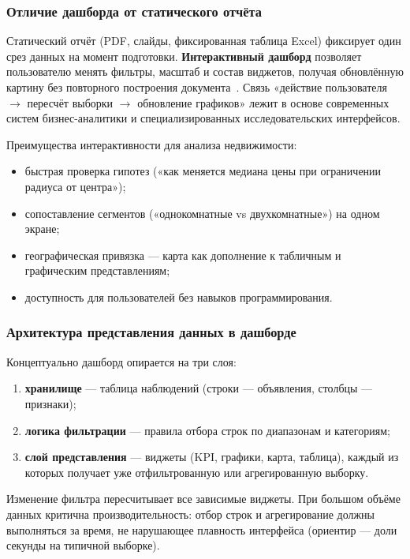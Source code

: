 \subsubsection{Отличие дашборда от статического отчёта}

Статический отчёт (PDF, слайды, фиксированная таблица Excel) фиксирует один срез данных на момент подготовки. \textbf{Интерактивный дашборд} позволяет пользователю менять фильтры, масштаб и состав виджетов, получая обновлённую картину без повторного построения документа~\cite{filatov2013,filimonova2024,dashboard-tufte}. Связь «действие пользователя $\rightarrow$ пересчёт выборки $\rightarrow$ обновление графиков» лежит в основе современных систем бизнес-аналитики и специализированных исследовательских интерфейсов.

Преимущества интерактивности для анализа недвижимости:
\begin{itemize}
    \item быстрая проверка гипотез («как меняется медиана цены при ограничении радиуса от центра»);
    \item сопоставление сегментов («однокомнатные vs двухкомнатные») на одном экране;
    \item географическая привязка --- карта как дополнение к табличным и графическим представлениям;
    \item доступность для пользователей без навыков программирования.
\end{itemize}

\subsubsection{Архитектура представления данных в дашборде}

Концептуально дашборд опирается на три слоя:
\begin{enumerate}
    \item \textbf{хранилище} --- таблица наблюдений (строки --- объявления, столбцы --- признаки);
    \item \textbf{логика фильтрации} --- правила отбора строк по диапазонам и категориям;
    \item \textbf{слой представления} --- виджеты (KPI, графики, карта, таблица), каждый из которых получает уже отфильтрованную или агрегированную выборку.
\end{enumerate}
Изменение фильтра пересчитывает все зависимые виджеты. При большом объёме данных критична производительность: отбор строк и агрегирование должны выполняться за время, не нарушающее плавность интерфейса (ориентир --- доли секунды на типичной выборке).

